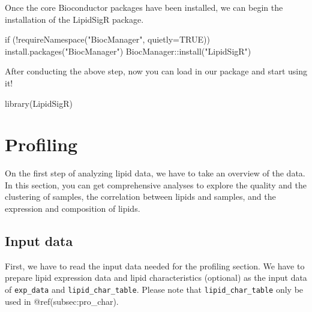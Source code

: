 \documentclass[]{article}
\newcommand{\hlstr}[1]{\textcolor[rgb]{0.251,0.627,0.251}{#1}}%
\newcommand{\hlopt}[1]{\textcolor[rgb]{0,0,0}{#1}}%
\newcommand{\hlstd}[1]{\textcolor[rgb]{0.251,0.251,0.251}{#1}}%
\newcommand{\hlkwc}[1]{\textcolor[rgb]{0.251,0.251,0.251}{#1}}%
\newcommand{\hlkwd}[1]{\textcolor[rgb]{0.878,0.439,0.125}{#1}}%
\newenvironment{Shaded}{\begin{myshaded}}{\end{myshaded}}
\newcommand{\KeywordTok}[1]{\hlkwd{#1}}
\newcommand{\DataTypeTok}[1]{\hlkwc{#1}}
\newcommand{\StringTok}[1]{\hlstr{#1}}
\newcommand{\OtherTok}[1]{{#1}}
\newcommand{\ControlFlowTok}[1]{\hlkwd{#1}}
\newcommand{\OperatorTok}[1]{\hlopt{#1}}
\newcommand{\NormalTok}[1]{\hlstd{#1}}
\begin{document}
Once the core Bioconductor packages have been installed, we can begin the installation of the LipidSigR package.

\begin{Shaded}
\begin{Highlighting}[]
\ControlFlowTok{if}\NormalTok{ (}\OperatorTok{!}\KeywordTok{requireNamespace}\NormalTok{(}\StringTok{"BiocManager"}\NormalTok{, }\DataTypeTok{quietly=}\OtherTok{TRUE}\NormalTok{))}
    \KeywordTok{install.packages}\NormalTok{(}\StringTok{"BiocManager"}\NormalTok{)}
\NormalTok{BiocManager}\OperatorTok{::}\KeywordTok{install}\NormalTok{(}\StringTok{"LipidSigR"}\NormalTok{)}
\end{Highlighting}
\end{Shaded}

After conducting the above step, now you can load in our package and start using it!

\begin{Shaded}
\begin{Highlighting}[]
\KeywordTok{library}\NormalTok{(LipidSigR)}
\end{Highlighting}
\end{Shaded}

\hypertarget{Profiling}{%
\section{Profiling}\label{Profiling}}

On the first step of analyzing lipid data, we have to take an overview of the data. In this section, you can get comprehensive analyses to explore the quality and the clustering of samples, the correlation between lipids and samples, and the expression and composition of lipids.

\hypertarget{input-data}{%
\subsection{Input data}\label{input-data}}

First, we have to read the input data needed for the profiling section. We have to prepare lipid expression data and lipid characteristics (optional) as the input data of \texttt{exp\_data} and \texttt{lipid\_char\_table}. Please note that \texttt{lipid\_char\_table} only be used in @ref(subsec:pro\_char).
\end{document}
